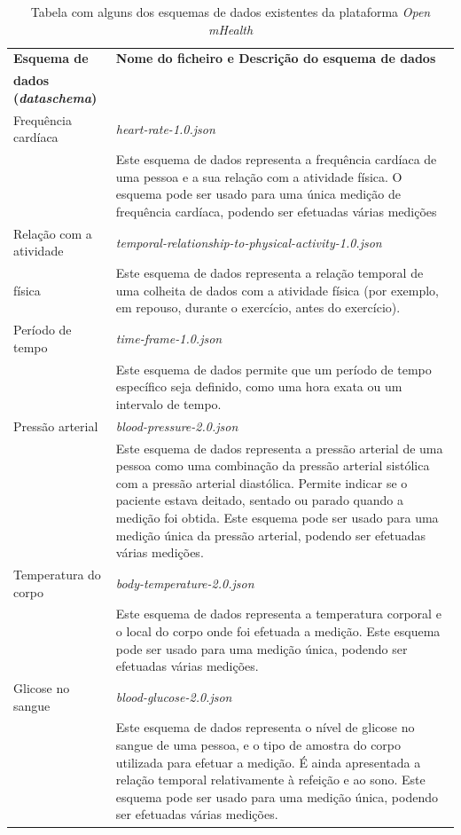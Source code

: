 \begin{table}[H]
\centering
\label{t:schemaslist}
\begin{tabularx}{1\textwidth}{p{4cm} p{10.7cm}}
 \textbf{Esquema de }  &   \textbf{Nome do ficheiro e Descrição do esquema de dados}  \\
 \textbf{dados (\textit{dataschema})} & \\
\hline
Frequência cardíaca & \textit{heart-rate-1.0.json} \\ 
& Este esquema de dados representa a frequência cardíaca de uma pessoa e a sua relação com a atividade física. O esquema pode ser usado para uma única medição de frequência cardíaca, podendo ser efetuadas várias medições\\ \hline

Relação com a atividade & \textit{temporal-relationship-to-physical-activity-1.0.json} \\
física& Este esquema de dados representa a relação temporal de uma colheita de dados com a atividade física (por exemplo, em repouso, durante o exercício, antes do exercício). \\ \hline

Período de tempo & \textit{time-frame-1.0.json} \\
& Este esquema de dados permite que um período de tempo específico seja definido, como uma hora exata ou um intervalo de tempo. \\ \hline

Pressão arterial & \textit{blood-pressure-2.0.json} \\ 
& Este esquema de dados representa a pressão arterial de uma pessoa como uma combinação da pressão arterial sistólica com a pressão arterial diastólica. Permite indicar se o paciente estava deitado, sentado ou parado quando a medição foi obtida. Este esquema pode ser usado para uma medição única da pressão arterial, podendo ser efetuadas várias medições. \\ \hline

Temperatura do corpo & \textit{body-temperature-2.0.json} \\
& Este esquema de dados representa a temperatura corporal e o local do corpo onde foi efetuada a medição. Este esquema pode ser usado para uma medição única, podendo ser efetuadas várias medições. \\ \hline

Glicose no sangue & \textit{blood-glucose-2.0.json} \\ 
& Este esquema de dados representa o nível de glicose no sangue de uma pessoa, e o tipo de amostra do corpo utilizada para efetuar a medição. É ainda apresentada a relação temporal relativamente à refeição e ao sono. Este esquema pode ser usado para uma medição única, podendo ser efetuadas várias medições.
                 
\end{tabularx}
\caption{Tabela com alguns dos esquemas de dados existentes da plataforma \textit{Open mHealth}}
\end{table}




